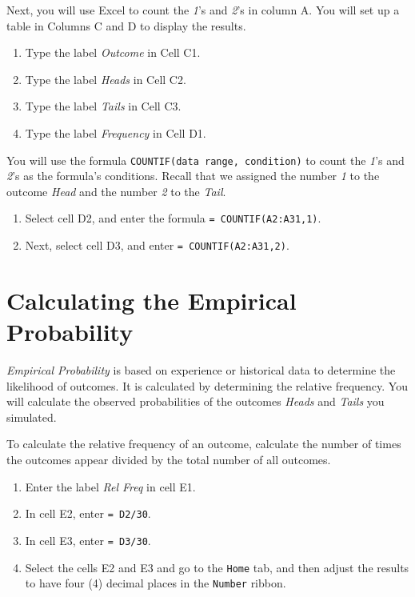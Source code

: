 \documentclass[
  12pt,
  letterpaper,
]{book}
\providecommand{\tightlist}{%
  \setlength{\itemsep}{0pt}\setlength{\parskip}{0pt}}
\begin{document}
Next, you will use Excel to count the \emph{1}'s and \emph{2}'s in column A. You will set up a table in Columns C and D to display the results.

\begin{enumerate}
\def\labelenumi{\arabic{enumi}.}
\tightlist
\item
  Type the label \emph{Outcome} in Cell C1.
\item
  Type the label \emph{Heads} in Cell C2.
\item
  Type the label \emph{Tails} in Cell C3.
\item
  Type the label \emph{Frequency} in Cell D1.
\end{enumerate}

You will use the formula \texttt{COUNTIF(data\ range,\ condition)} to count the \emph{1}'s and \emph{2}'s as the formula's conditions. Recall that we assigned the number \emph{1} to the outcome \emph{Head} and the number \emph{2} to the \emph{Tail}.

\begin{enumerate}
\def\labelenumi{\arabic{enumi}.}
\tightlist
\item
  Select cell D2, and enter the formula \texttt{=\ COUNTIF(A2:A31,1)}.
\item
  Next, select cell D3, and enter \texttt{=\ COUNTIF(A2:A31,2)}.
\end{enumerate}

\hypertarget{calculating-the-empirical-probability}{%
\section{Calculating the Empirical Probability}\label{calculating-the-empirical-probability}}

\emph{Empirical Probability} is based on experience or historical data to determine the likelihood of outcomes. It is calculated by determining the relative frequency. You will calculate the observed probabilities of the outcomes \emph{Heads} and \emph{Tails} you simulated.

To calculate the relative frequency of an outcome, calculate the number of times the outcomes appear divided by the total number of all outcomes.

\begin{enumerate}
\def\labelenumi{\arabic{enumi}.}
\tightlist
\item
  Enter the label \emph{Rel Freq} in cell E1.
\item
  In cell E2, enter \texttt{=\ D2/30}.
\item
  In cell E3, enter \texttt{=\ D3/30}.
\item
  Select the cells E2 and E3 and go to the \texttt{Home} tab, and then adjust the results to have four (4) decimal places in the \texttt{Number} ribbon.
\end{enumerate}
\end{document}
